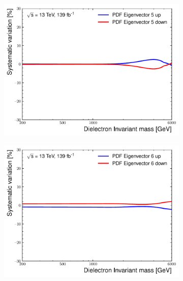 \begin{figure}[h!]
\begin{subfigure}[b]{0.42\textwidth}
        \includegraphics[width=\textwidth]{figures/analysis/datamc/Uncertainties/theory/ee/backgroundTemplate_KF_PDF_EV5.pdf}
        \label{fig:uncert:eepdfvar5}
    \end{subfigure}
    \begin{subfigure}[b]{0.42\textwidth}
        \centering
        \includegraphics[width=\textwidth]{figures/analysis/datamc/Uncertainties/theory/ee/backgroundTemplate_KF_PDF_EV6.pdf}
        \label{fig:uncert:eepdfvar6}
    \end{subfigure}
    \begin{subfigure}[b]{0.42\textwidth}
        \centering

\end{subfigure}
\end{figure}
